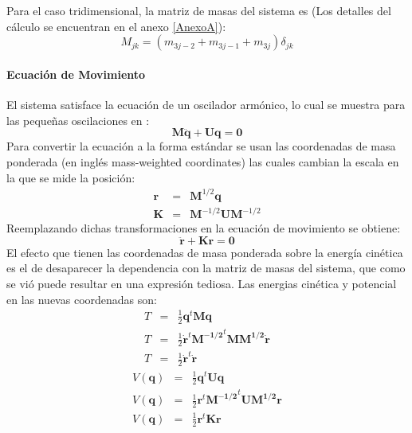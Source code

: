 Para el caso tridimensional, la matriz de masas del sistema es (Los detalles del c\'{a}lculo se encuentran en el anexo \ref{AnexoA}):
\begin{equation}
M_{jk}=\left( m_{3j-2}+m_{3j-1}+m_{3j} \right) \delta_{jk}
\end{equation}

\paragraph{Ecuaci\'{o}n de Movimiento}\label{par:Ecmov}
El sistema satisface la ecuaci\'{o}n de un oscilador arm\'{o}nico, lo cual se muestra para las peque\~{n}as oscilaciones en \cite[Chapter~6]{Goldstein2001}:
\begin{equation}\label{eq:14}
\mathbf{M}\ddot{\mathbf{q}}+\mathbf{U}\mathbf{q}=\mathbf{0}
\end{equation}
Para convertir la ecuaci\'{o}n a la forma est\'{a}ndar se usan las coordenadas de masa ponderada (en ingl\'{e}s mass-weighted coordinates) las cuales cambian la escala en la que se mide la posici\'{o}n:
\begin{eqnarray}\label{eq:15}
\mathbf{r}&=&\mathbf{M}^{1/2}\mathbf{q}\\
\mathbf{K}&=&\mathbf{M}^{-1/2}\mathbf{U}\mathbf{M}^{-1/2}\nonumber
\end{eqnarray}
Reemplazando dichas transformaciones en la ecuaci\'{o}n de movimiento se obtiene:
\begin{equation}\label{eq:16}
\ddot{\mathbf{r}}+\mathbf{K}\mathbf{r}=\mathbf{0}
\end{equation}
El efecto que tienen las coordenadas de masa ponderada sobre la energ\'{i}a cin\'{e}tica  es el de desaparecer la dependencia con la matriz de masas del sistema, que como se vi\'{o} puede resultar en una expresi\'{o}n tediosa. Las energias cin\'{e}tica y potencial en las nuevas coordenadas son:
\begin{eqnarray}\label{eq:19}
T&=&\frac{1}{2}\mathbf{q}^t\mathbf{M}\mathbf{q} \nonumber \\
T&=&\frac{1}{2}\mathbf{\dot{r}}^t\mathbf{M^{-1/2}}^t\mathbf{M}\mathbf{M^{1/2}}\mathbf{\dot{r}}\nonumber \\
T&=&\frac{1}{2}\mathbf{\dot{r}}^t \mathbf{\dot{r}}
\end{eqnarray}
\begin{eqnarray}\label{eq:20}
V(\mathbf{q})&=&\frac{1}{2}\mathbf{q}^t\mathbf{U}\mathbf{q} \nonumber \\
V(\mathbf{q})&=&\frac{1}{2}\mathbf{r}^t\mathbf{M^{-1/2}}^t\mathbf{U}\mathbf{M^{1/2}}\mathbf{r} \nonumber \\
V(\mathbf{q})&=&\frac{1}{2}\mathbf{r}^t\mathbf{K}\mathbf{r}
\end{eqnarray}
